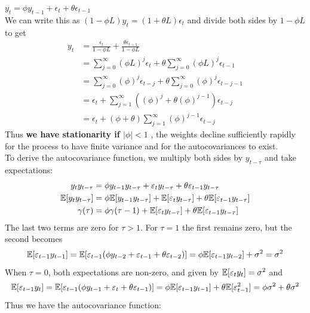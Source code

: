 \documentclass[DIV=14,titlepage=false]{scrreprt}
\begin{document}
\begin{example}[ARMA(1,1)]
    $y_t = \phi y_{t-1} + \epsilon_t + \theta \epsilon_{t-1}$ \\
    We can write this as $(1-\phi L) y_t = (1 + \theta L) \epsilon_t$ and divide both sides by $1- \phi L$ to get 
    \begin{align*} 
        y_t &= \frac{\epsilon_t}{1-\phi L} + \frac{\theta \epsilon_{t-1}}{1-\phi L} \\
        &= \sum_{j=0}^{\infty} (\phi L)^j \epsilon_t + \theta \sum_{j=0}^{\infty} (\phi L)^j  \epsilon_{t-1} \\
        &= \sum_{j=0}^{\infty} (\phi)^j \epsilon_{t-j} + \theta \sum_{j=0}^{\infty} (\phi)^j  \epsilon_{t-j-1} \\
        &= \epsilon_t + \sum_{j=1}^{\infty} ((\phi)^j + \theta (\phi)^{j-1}) \epsilon_{t-j} \\
        &= \epsilon_t + (\phi + \theta) \sum_{j=1}^{\infty} (\phi)^{j-1} \epsilon_{t-j}
    \end{align*}
    Thus \textbf{we have stationarity if $|\phi| < 1$ }, the weights decline sufficiently rapidly for the process to have finite variance and for the autocovariances to exist.\\
    To derive the autocovariance function, we multiply both sides by $y_{t-\tau}$ and take expectations:
    \begin{align*}
        y_t y_{t-\tau} &= \phi y_{t-1} y_{t-\tau} + \varepsilon_t y_{t-\tau} + \theta \varepsilon_{t-1} y_{t-\tau} \\
        \mathbb{E}[y_t y_{t-\tau}] &= \phi \mathbb{E}[y_{t-1} y_{t-\tau}] + \mathbb{E}[\varepsilon_t y_{t-\tau}] + \theta \mathbb{E}[\varepsilon_{t-1} y_{t-\tau}] \\
        \gamma(\tau) &= \phi \gamma(\tau-1) + \mathbb{E}[\varepsilon_t y_{t-\tau}] + \theta \mathbb{E}[\varepsilon_{t-1} y_{t-\tau}]
    \end{align*}
The last two terms are zero for $\tau >1$. For $\tau = 1$ the first remains zero, but the second becomes 
\[
    \mathbb{E}[\varepsilon_{t-1}y_{t-1}] = \mathbb{E}[\varepsilon_{t-1}(\phi y_{t-2} + \varepsilon_{t-1} + \theta \varepsilon_{t-2})] = \phi \mathbb{E}[\varepsilon_{t-1}y_{t-2}] + \sigma^2 = \sigma^2
\]
When $\tau = 0$, both expectations are non-zero, and given by $\mathbb{E}[\varepsilon_t y_t] = \sigma^2$ and 
\[
    \mathbb{E} [\varepsilon_{t-1} y_t] = \mathbb{E} [\varepsilon_{t-1} (\phi y_{t-1} + \varepsilon_t + \theta \varepsilon_{t-1})] = \phi \mathbb{E} [\varepsilon_{t-1} y_{t-1}] + \theta \mathbb{E} [\varepsilon_{t-1}^2] = \phi \sigma^2 + \theta \sigma^2
\]
Thus we have the autocovariance function:
\begin{align*}

\end{align*}
\end{example}
\end{document}

